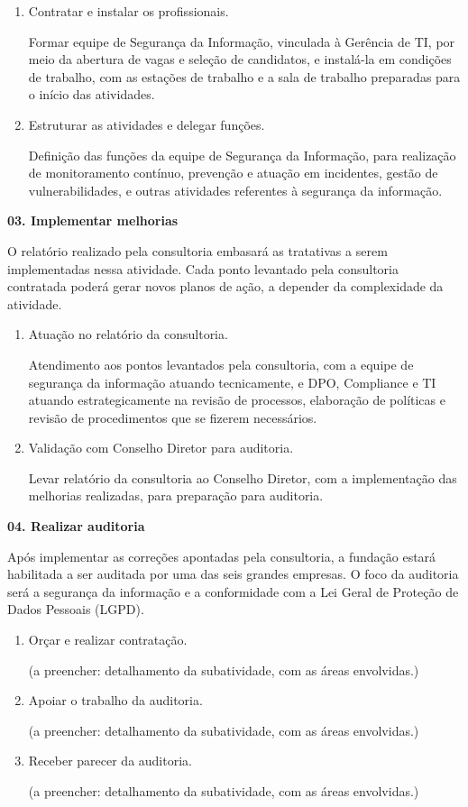 \documentclass[12pt,a4paper]{article}
\newcommand{\atividade}[1]{%
  \par\vspace{\dimexpr16pt-\parskip\relax}%
  {\bfseries\color{azulAtividade}#1}%
  \par\vspace{\dimexpr8pt-\parskip\relax}%
}
\begin{document}
\begin{enumerate}
  \item Contratar e instalar os profissionais.

        Formar equipe de Segurança da Informação, vinculada à Gerência de TI, por meio da abertura de vagas e seleção de candidatos, e instalá-la em condições de trabalho, com as estações de trabalho e a sala de trabalho preparadas para o início das atividades.
  \item Estruturar as atividades e delegar funções.

        Definição das funções da equipe de Segurança da Informação, para realização de monitoramento contínuo, prevenção e atuação em incidentes, gestão de vulnerabilidades, e outras atividades referentes à segurança da informação.
\end{enumerate}

\atividade{03. Implementar melhorias}

O relatório realizado pela consultoria embasará as tratativas a serem implementadas nessa atividade. Cada ponto levantado pela consultoria contratada poderá gerar novos planos de ação, a depender da complexidade da atividade.

\begin{enumerate}
  \item Atuação no relatório da consultoria.

        Atendimento aos pontos levantados pela consultoria, com a equipe de segurança da informação atuando tecnicamente, e DPO, Compliance e TI atuando estrategicamente na revisão de processos, elaboração de políticas e revisão de procedimentos que se fizerem necessários.
  \item Validação com Conselho Diretor para auditoria.

        Levar relatório da consultoria ao Conselho Diretor, com a implementação das melhorias realizadas, para preparação para auditoria.
\end{enumerate}

\atividade{04. Realizar auditoria}

Após implementar as correções apontadas pela consultoria, a fundação estará habilitada a ser auditada por uma das seis grandes empresas. O foco da auditoria será a segurança da informação e a conformidade com a Lei Geral de Proteção de Dados Pessoais (LGPD).

\begin{enumerate}
  \item Orçar e realizar contratação.

        (a preencher: detalhamento da subatividade, com as áreas envolvidas.)
  \item Apoiar o trabalho da auditoria.

        (a preencher: detalhamento da subatividade, com as áreas envolvidas.)
  \item Receber parecer da auditoria.

        (a preencher: detalhamento da subatividade, com as áreas envolvidas.)
\end{enumerate}
\end{document}
